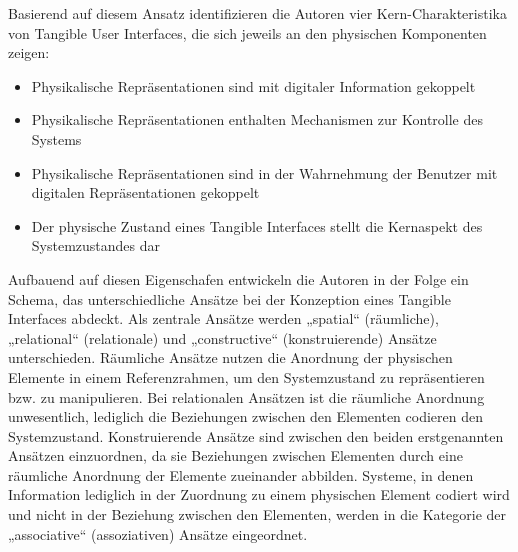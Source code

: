 Basierend auf diesem Ansatz identifizieren die Autoren vier Kern-Charakteristika von Tangible User Interfaces, die sich jeweils an den physischen Komponenten zeigen:
\begin{itemize}
	\item Physikalische Repräsentationen sind mit digitaler Information gekoppelt
	\item Physikalische Repräsentationen enthalten Mechanismen zur Kontrolle des Systems
	\item Physikalische Repräsentationen sind in der Wahrnehmung der Benutzer mit digitalen Repräsentationen gekoppelt
	\item Der physische Zustand eines Tangible Interfaces stellt die Kernaspekt des Systemzustandes dar
\end{itemize}

Aufbauend auf diesen Eigenschafen entwickeln die Autoren in der Folge ein Schema, das unterschiedliche Ansätze bei der Konzeption eines Tangible Interfaces abdeckt. Als zentrale Ansätze werden „spatial“ (räumliche), „relational“ (relationale) und „constructive“ (konstruierende) Ansätze unterschieden. Räumliche Ansätze nutzen die Anordnung der physischen Elemente in einem Referenzrahmen, um den Systemzustand zu repräsentieren bzw. zu manipulieren. Bei relationalen Ansätzen ist die räumliche Anordnung unwesentlich, lediglich die Beziehungen zwischen den Elementen codieren den Systemzustand. Konstruierende Ansätze sind zwischen den beiden erstgenannten Ansätzen einzuordnen, da sie Beziehungen zwischen Elementen durch eine räumliche Anordnung der Elemente zueinander abbilden. Systeme, in denen Information lediglich in der Zuordnung zu einem physischen Element codiert wird und nicht in der Beziehung zwischen den Elementen, werden in die Kategorie der „associative“ (assoziativen) Ansätze eingeordnet.

